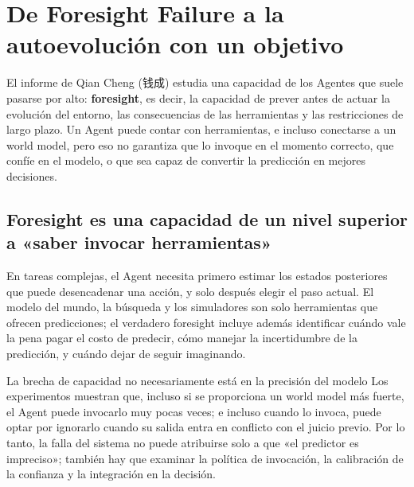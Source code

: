 \section{De Foresight Failure a la autoevolución con un objetivo}

El informe de Qian Cheng (钱成) estudia una capacidad de los Agentes que suele pasarse por alto: \textbf{foresight}, es decir, la capacidad de prever antes de actuar la evolución del entorno, las consecuencias de las herramientas y las restricciones de largo plazo. Un Agent puede contar con herramientas, e incluso conectarse a un world model, pero eso no garantiza que lo invoque en el momento correcto, que confíe en el modelo, o que sea capaz de convertir la predicción en mejores decisiones.


\subsection{Foresight es una capacidad de un nivel superior a «saber invocar herramientas»}

En tareas complejas, el Agent necesita primero estimar los estados posteriores que puede desencadenar una acción, y solo después elegir el paso actual. El modelo del mundo, la búsqueda y los simuladores son solo herramientas que ofrecen predicciones; el verdadero foresight incluye además identificar cuándo vale la pena pagar el costo de predecir, cómo manejar la incertidumbre de la predicción, y cuándo dejar de seguir imaginando.



\begin{importantbox}{La brecha de capacidad no necesariamente está en la precisión del modelo}
Los experimentos muestran que, incluso si se proporciona un world model más fuerte, el Agent puede invocarlo muy pocas veces; e incluso cuando lo invoca, puede optar por ignorarlo cuando su salida entra en conflicto con el juicio previo. Por lo tanto, la falla del sistema no puede atribuirse solo a que «el predictor es impreciso»; también hay que examinar la política de invocación, la calibración de la confianza y la integración en la decisión.
\end{importantbox}

